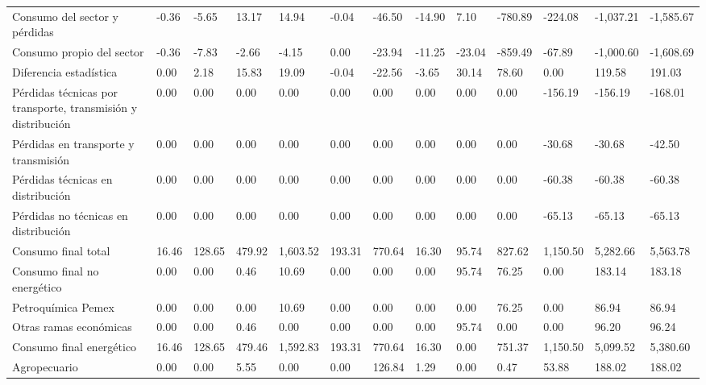 \documentclass{sener2025}
\begin{document}
\begin{tabladoradoLargo}
\begin{xltabular}{\textwidth}{QZZZZZZZZZZZZ}
    Consumo del sector y pérdidas & -0.36 & -5.65 & 13.17 & 14.94 & -0.04 & -46.50 & -14.90 & 7.10 & -780.89 & -224.08 & -1,037.21 & -1,585.67 \\
    \hspace{1.35em} Consumo propio del sector & -0.36 & -7.83 & -2.66 & -4.15 & 0.00 & -23.94 & -11.25 & -23.04 & -859.49 & -67.89 & -1,000.60 & -1,608.69 \\
    \hspace{1.35em} Diferencia estadística & 0.00 & 2.18 & 15.83 & 19.09 & -0.04 & -22.56 & -3.65 & 30.14 & 78.60 & 0.00 & 119.58 & 191.03 \\
    \hspace{1.35em} Pérdidas técnicas por transporte, transmisión y distribución & 0.00 & 0.00 & 0.00 & 0.00 & 0.00 & 0.00 & 0.00 & 0.00 & 0.00 & -156.19 & -156.19 & -168.01 \\
    \hspace{2.7em} Pérdidas en transporte y transmisión & 0.00 & 0.00 & 0.00 & 0.00 & 0.00 & 0.00 & 0.00 & 0.00 & 0.00 & -30.68 & -30.68 & -42.50 \\
    \hspace{2.7em} Pérdidas técnicas en distribución & 0.00 & 0.00 & 0.00 & 0.00 & 0.00 & 0.00 & 0.00 & 0.00 & 0.00 & -60.38 & -60.38 & -60.38 \\
    \hspace{2.7em} Pérdidas no técnicas  en distribución & 0.00 & 0.00 & 0.00 & 0.00 & 0.00 & 0.00 & 0.00 & 0.00 & 0.00 & -65.13 & -65.13 & -65.13 \\
    Consumo final total & 16.46 & 128.65 & 479.92 & 1,603.52 & 193.31 & 770.64 & 16.30 & 95.74 & 827.62 & 1,150.50 & 5,282.66 & 5,563.78 \\
    \hspace{1.35em} Consumo final no energético & 0.00 & 0.00 & 0.46 & 10.69 & 0.00 & 0.00 & 0.00 & 95.74 & 76.25 & 0.00 & 183.14 & 183.18 \\
    \hspace{2.7em} Petroquímica Pemex & 0.00 & 0.00 & 0.00 & 10.69 & 0.00 & 0.00 & 0.00 & 0.00 & 76.25 & 0.00 & 86.94 & 86.94 \\
    \hspace{2.7em} Otras ramas económicas & 0.00 & 0.00 & 0.46 & 0.00 & 0.00 & 0.00 & 0.00 & 95.74 & 0.00 & 0.00 & 96.20 & 96.24 \\
    Consumo final energético & 16.46 & 128.65 & 479.46 & 1,592.83 & 193.31 & 770.64 & 16.30 & 0.00 & 751.37 & 1,150.50 & 5,099.52 & 5,380.60 \\
    \hspace{2.7em} Agropecuario & 0.00 & 0.00 & 5.55 & 0.00 & 0.00 & 126.84 & 1.29 & 0.00 & 0.47 & 53.88 & 188.02 & 188.02 \\

\end{xltabular}
\end{tabladoradoLargo}
\end{document}
